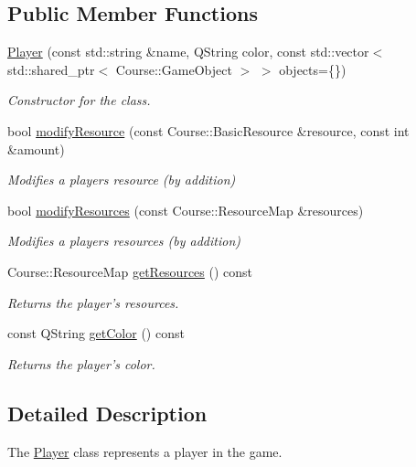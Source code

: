 \subsection*{Public Member Functions}
\begin{DoxyCompactItemize}
\item 
\hyperlink{classPlayer_a4d028f546b1dea57a0c0d76fc3a0de55}{Player} (const std\-::string \&name, Q\-String color, const std\-::vector$<$ std\-::shared\-\_\-ptr$<$ Course\-::\-Game\-Object $>$ $>$ objects=\{\})
\begin{DoxyCompactList}\small\item\em Constructor for the class. \end{DoxyCompactList}\item 
bool \hyperlink{classPlayer_a2ca3b33712ae6ef5be021a89c4f0b812}{modify\-Resource} (const Course\-::\-Basic\-Resource \&resource, const int \&amount)
\begin{DoxyCompactList}\small\item\em Modifies a players resource (by addition) \end{DoxyCompactList}\item 
bool \hyperlink{classPlayer_a8f2a8cb9cdda8bb195b90172d2b4e0e9}{modify\-Resources} (const Course\-::\-Resource\-Map \&resources)
\begin{DoxyCompactList}\small\item\em Modifies a players resources (by addition) \end{DoxyCompactList}\item 
Course\-::\-Resource\-Map \hyperlink{classPlayer_a7d91805e49dd4f33f9696c0dc6216993}{get\-Resources} () const 
\begin{DoxyCompactList}\small\item\em Returns the player's resources. \end{DoxyCompactList}\item 
const Q\-String \hyperlink{classPlayer_a228fc8436183fc5e60a8a5c5f1973607}{get\-Color} () const 
\begin{DoxyCompactList}\small\item\em Returns the player's color. \end{DoxyCompactList}\end{DoxyCompactItemize}


\subsection{Detailed Description}
The \hyperlink{classPlayer}{Player} class represents a player in the game. 

